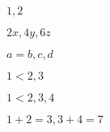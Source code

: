 \documentclass{article}
\begin{document}
$1,2$

$2x, 4y, 6z$

$a=b,c,d$

$1<2,3$

$1<2,3,4$

$1+2=3 , 3+4=7$
\end{document}
